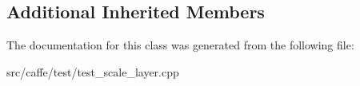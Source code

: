 \subsection*{Additional Inherited Members}


The documentation for this class was generated from the following file\+:\begin{DoxyCompactItemize}
\item 
src/caffe/test/test\+\_\+scale\+\_\+layer.\+cpp\end{DoxyCompactItemize}

